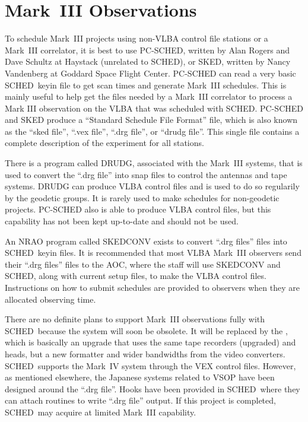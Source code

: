 \documentclass{report}
\newcommand{\sched}{{\sc SCHED}}
\newcommand{\schedb}{{\sc SCHED~}}
\begin{document}
\section{\label{SEC:MKIII}Mark~III Observations}

To schedule Mark~III projects using non-VLBA control file stations or
a Mark~III correlator, it is best to use {\sc PC-SCHED}, written by
Alan Rogers and Dave Schultz at Haystack (unrelated to \sched), or
{\sc SKED}, written by Nancy Vandenberg at Goddard Space Flight
Center.  {\sc PC-SCHED} can read a very basic \schedb keyin file to
get scan times and generate Mark~III schedules.  This is mainly useful
to help get the files needed by a Mark~III correlator to process a
Mark III observation on the VLBA that was scheduled with \sched.  {\sc
PC-SCHED} and {\sc SKED} produce a ``Standard Schedule File Format''
file, which is also known as the ``sked file'', ``.vex file'', ``.drg
file'', or ``drudg file''.  This single file contains a complete
description of the experiment for all stations.

There is a program called {\sc DRUDG}, associated with the Mark~III
systems, that is used to convert the ``.drg file'' into snap files to
control the antennas and tape systems.  {\sc DRUDG} can produce VLBA
control files and is used to do so regularily by the geodetic groups.
It is rarely used to make schedules for non-geodetic projects.  {\sc
PC-SCHED} also is able to produce VLBA control files, but this
capability has not been kept up-to-date and should not be used.

An NRAO program called {\sc SKEDCONV} exists to convert ``.drg files''
files into \schedb keyin files. It is recommended that most VLBA
Mark~III observers send their ``.drg files'' files to the AOC,
where the staff will use {\sc SKEDCONV} and \sched, along with
current setup files, to make the VLBA control files.  Instructions on
how to submit schedules are provided to observers when they are
allocated observing time.

There are no definite plans to support Mark~III observations fully
with \schedb because the system will soon be obsolete.  It will be
replaced by the , which is basically
an upgrade that uses the same tape recorders (upgraded) and heads, but
a new formatter and wider bandwidths from the video converters.
\schedb supports the Mark~IV system through the VEX control files.
However, as mentioned elsewhere, the Japanese systems related to VSOP
have been designed around the ``.drg file''.  Hooks have been provided
in \schedb where they can attach routines to write ``.drg file''
output.  If this project is completed, \schedb may acquire at limited
Mark~III capability.
\end{document}
